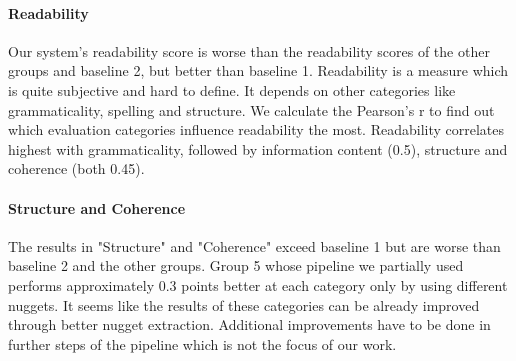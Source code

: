 \paragraph{Readability}
Our system's readability score is worse than the readability scores of the other groups and baseline 2, but better than baseline 1. Readability is a measure which is quite subjective and hard to define. It depends on other categories like grammaticality, spelling and structure. We calculate the Pearson's r to find out which evaluation categories influence readability the most. Readability correlates highest with grammaticality, followed by information content (0.5), structure and coherence (both 0.45).   

\paragraph{Structure and Coherence}
The results in "Structure" and "Coherence" exceed baseline 1 but are worse than baseline 2 and the other groups. Group 5 whose pipeline we partially used performs approximately 0.3 points better at each category only by using different nuggets. It seems like the results of these categories can be already improved through better nugget extraction. Additional improvements have to be done in further steps of the pipeline which is not the focus of our work.

